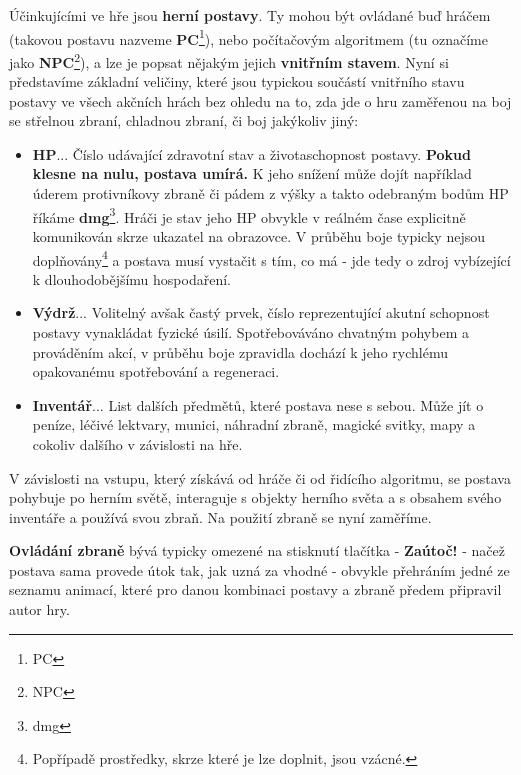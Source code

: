 Účinkujícími ve hře jsou \textbf{herní postavy}. Ty mohou být ovládané buď hráčem (takovou postavu nazveme \textbf{\acs{PC}}\footnote{\Acl{PC}}), nebo počítačovým algoritmem (tu označíme jako \textbf{\acs{NPC}}\footnote{\Acl{NPC}}), a lze je popsat nějakým jejich \textbf{vnitřním stavem}. Nyní si představíme základní veličiny, které jsou typickou součástí vnitřního stavu postavy ve všech akčních hrách bez ohledu na to, zda jde o hru zaměřenou na boj se střelnou zbraní, chladnou zbraní, či boj jakýkoliv jiný:

\begin{itemize}
    \item \textbf{\ac{HP}}... Číslo udávající zdravotní stav a životaschopnost postavy. \textbf{Pokud klesne na nulu, postava umírá.} K jeho snížení může dojít například úderem protivníkovy zbraně či pádem z výšky a takto odebraným bodům HP říkáme \textbf{\acs{dmg}}\footnote{\Acl{dmg}}. Hráči je stav jeho HP obvykle v reálném čase explicitně komunikován skrze ukazatel na obrazovce. V průběhu boje typicky nejsou doplňovány\footnote{Popřípadě prostředky, skrze které je lze doplnit, jsou vzácné.} a postava musí vystačit s tím, co má - jde tedy o zdroj vybízející k dlouhodobějšímu hospodaření.
    \item \textbf{Výdrž}... Volitelný avšak častý prvek, číslo reprezentující akutní schopnost postavy vynakládat fyzické úsilí. Spotřebováváno chvatným pohybem a prováděním akcí, v průběhu boje zpravidla dochází k jeho rychlému opakovanému spotřebování a regeneraci.
    \item \textbf{Inventář}... List dalších předmětů, které postava nese s sebou. Může jít o peníze, léčivé lektvary, munici, náhradní zbraně, magické svitky, mapy a cokoliv dalšího v závislosti na hře. 
\end{itemize}

V závislosti na vstupu, který získává od hráče či od řidícího algoritmu, se postava pohybuje po herním světě, interaguje s objekty herního světa a s obsahem svého inventáře a používá svou zbraň. Na použití zbraně se nyní zaměříme.

\textbf{Ovládání zbraně} bývá typicky omezené na stisknutí tlačítka - \textbf{Zaútoč!} - načež postava sama provede útok tak, jak uzná za vhodné - obvykle přehráním jedné ze seznamu animací, které pro danou kombinaci postavy a zbraně předem připravil autor hry.

